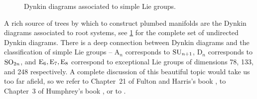 \begin{figure}[ht]
	\vspace{1em}
	\caption{Dynkin diagrams associated to simple Lie groups.} \label{fig:dynkin-diagram-trees}
\end{figure}

A rich source of trees by which to construct plumbed manifolds are the Dynkin diagrams associated to root systems, see \cref{fig:dynkin-diagram-trees} for the complete set of undirected Dynkin diagrams. There is a deep connection between Dynkin diagrams and the classification of simple Lie groups -- $\mathrm{A}_n$ corresponds to $\mathrm{SU}_{n+1}$, $\mathrm{D}_n$ corresponds to $\mathrm{SO}_{2n}$, and $\mathrm{E}_6, \mathrm{E}_7, \mathrm{E}_8$ correspond to exceptional Lie groups of dimensions 78, 133, and 248 respectively.
A complete discussion of this beautiful topic would take us too far afield, so we refer to Chapter~21 of Fulton and Harris's book \cite{fultonharris1991representation}, to Chapter~3 of Humphrey's book \cite{humphreys1972representation}, or to \cite{adams1996exceptional}.

